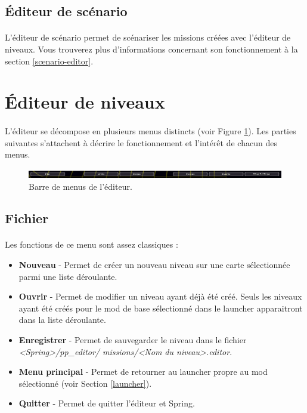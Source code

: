 \documentclass[a4paper]{article}
\begin{document}
\subsection{Éditeur de scénario}
\paragraph{ }
L'éditeur de scénario permet de scénariser les missions créées avec l'éditeur de niveaux. Vous trouverez plus d'informations concernant son fonctionnement à la section \ref{scenario-editor}.
\section{Éditeur de niveaux}\label{editor}
\paragraph{ }
L'éditeur se décompose en plusieurs menus distincts (voir Figure \ref{fig:editor-topbar}). Les parties suivantes s'attachent à décrire le fonctionnement et l'intérêt de chacun des menus.
\begin{figure}[H]
\centering
\includegraphics[width=\linewidth]{editor-topbar.png}
\caption{Barre de menus de l'éditeur.}
\label{fig:editor-topbar}
\end{figure}
\subsection{Fichier}
\paragraph{ }
Les fonctions de ce menu sont assez classiques :
\begin{itemize}
\item \textbf{Nouveau} - Permet de créer un nouveau niveau sur une carte sélectionnée parmi une liste déroulante.
\item \textbf{Ouvrir} - Permet de modifier un niveau ayant déjà été créé. Seuls les niveaux ayant été créés pour le mod de base sélectionné dans le launcher apparaitront dans la liste déroulante.
\item \textbf{Enregistrer} - Permet de sauvegarder le niveau dans le fichier \textit{<Spring>/pp\_editor/ missions/<Nom du niveau>.editor}.
\item \textbf{Menu principal} - Permet de retourner au launcher propre au mod sélectionné (voir Section \ref{launcher}).
\item \textbf{Quitter} - Permet de quitter l'éditeur et Spring.
\end{itemize}
\end{document}
